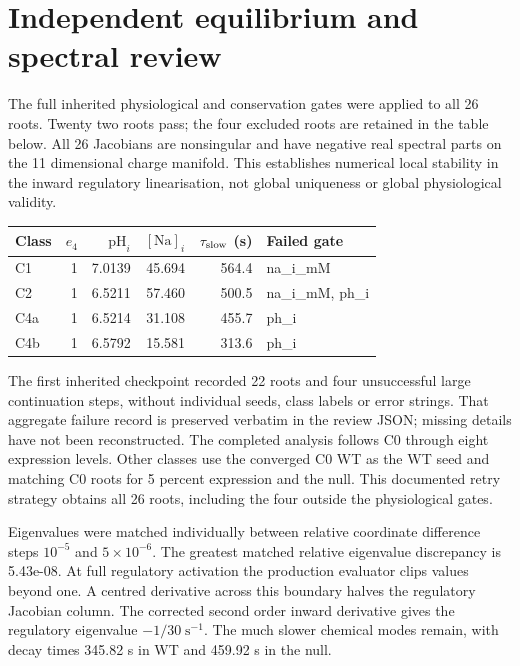 \section{Independent equilibrium and spectral review}

The full inherited physiological and conservation gates were applied to all 26 roots. Twenty two roots pass; the four excluded roots are retained in the table below. All 26 Jacobians are nonsingular and have negative real spectral parts on the 11 dimensional charge manifold. This establishes numerical local stability in the inward regulatory linearisation, not global uniqueness or global physiological validity.

\begin{center}\begin{tabular}{lrrrrl}\hline Class & $e_4$ & $\mathrm{pH}_i$ & $[\mathrm{Na}]_i$ & $\tau_{\rm slow}$ (s) & Failed gate\\\hline

C1 & 1 & 7.0139 & 45.694 & 564.4 & na\_i\_mM\\

C2 & 1 & 6.5211 & 57.460 & 500.5 & na\_i\_mM, ph\_i\\

C4a & 1 & 6.5214 & 31.108 & 455.7 & ph\_i\\

C4b & 1 & 6.5792 & 15.581 & 313.6 & ph\_i\\

\hline\end{tabular}\end{center}

The first inherited checkpoint recorded 22 roots and four unsuccessful large continuation steps, without individual seeds, class labels or error strings. That aggregate failure record is preserved verbatim in the review JSON; missing details have not been reconstructed. The completed analysis follows C0 through eight expression levels. Other classes use the converged C0 WT as the WT seed and matching C0 roots for 5 percent expression and the null. This documented retry strategy obtains all 26 roots, including the four outside the physiological gates.

Eigenvalues were matched individually between relative coordinate difference steps $10^{-5}$ and $5\times10^{-6}$. The greatest matched relative eigenvalue discrepancy is 5.43e-08. At full regulatory activation the production evaluator clips values beyond one. A centred derivative across this boundary halves the regulatory Jacobian column. The corrected second order inward derivative gives the regulatory eigenvalue $-1/30\;\mathrm{s}^{-1}$. The much slower chemical modes remain, with decay times 345.82 s in WT and 459.92 s in the null.

